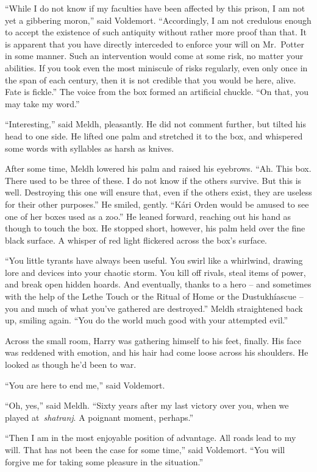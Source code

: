 ``While I do not know if my faculties have been affected by this prison,
I am not yet a gibbering moron,'' said Voldemort. ``Accordingly, I am
not credulous enough to accept the existence of such antiquity without
rather more proof than that. It is apparent that you have directly
interceded to enforce your will on Mr.~Potter in some manner. Such an
intervention would come at some risk, no matter your abilities. If you
took even the most miniscule of risks regularly, even only once in the
span of each century, then it is not credible that you would be here,
alive. Fate is fickle.'' The voice from the box formed an artificial
chuckle. ``On that, you may take my word.''

``Interesting,'' said Meldh, pleasantly. He did not comment further, but
tilted his head to one side. He lifted one palm and stretched it to the
box, and whispered some words with syllables as harsh as knives.

After some time, Meldh lowered his palm and raised his eyebrows. ``Ah.
This box. There used to be three of these. I do not know if the others
survive. But this is well. Destroying this one will ensure that, even if
the others exist, they are useless for their other purposes.'' He
smiled, gently. ``Kári Orden would be amused to see one of her boxes
used as a zoo.'' He leaned forward, reaching out his hand as though to
touch the box. He stopped short, however, his palm held over the fine
black surface. A whisper of red light flickered across the box's
surface.

``You little tyrants have always been useful. You swirl like a
whirlwind, drawing lore and devices into your chaotic storm. You kill
off rivals, steal items of power, and break open hidden hoards. And
eventually, thanks to a hero -- and sometimes with the help of the Lethe
Touch or the Ritual of Home or the Dustukhíascue -- you and much of what
you've gathered are destroyed.'' Meldh straightened back up, smiling
again. ``You do the world much good with your attempted evil.''

Across the small room, Harry was gathering himself to his feet, finally.
His face was reddened with emotion, and his hair had come loose across
his shoulders. He looked as though he'd been to war.

``You are here to end me,'' said Voldemort.

``Oh, yes,'' said Meldh. ``Sixty years after my last victory over you,
when we played at~\emph{shatranj}. A poignant moment, perhaps.''

``Then I am in the most enjoyable position of advantage. All roads lead
to my will. That has not been the case for some time,'' said Voldemort.
``You will forgive me for taking some pleasure in the situation.''

